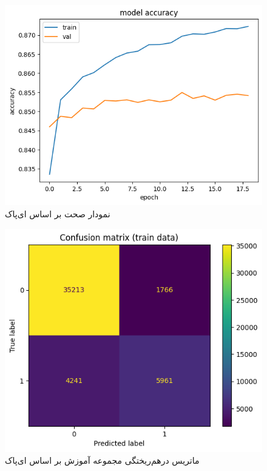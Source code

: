 \documentclass{article}
\begin{document}
\begin{figure}[!h]
    \centering\includegraphics[scale=.55]{./p7-2}
    \caption{نمودار صحت بر اساس ای‌پاک}\label{fig.72}
\end{figure}

\cleardoublepage

\begin{figure}[!h]
    \centering\includegraphics[scale=.55]{./p7-3}
    \caption{ماتریس درهم‌ریختگی مجموعه آموزش بر اساس ای‌پاک}\label{fig.73}
\end{figure}
\end{document}
